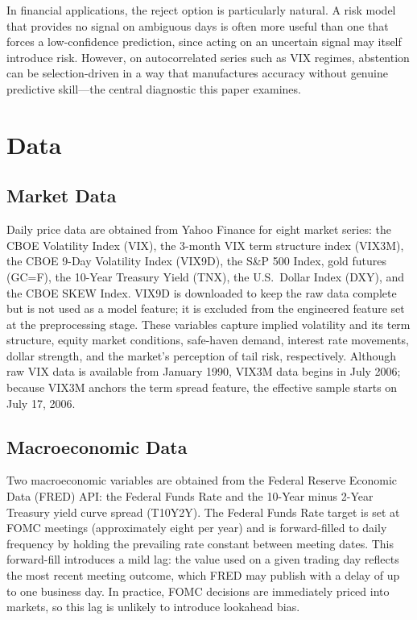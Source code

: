 \documentclass[12pt]{article}
\begin{document}
In financial applications, the reject option is particularly natural. A risk model that provides no signal on ambiguous days is often more useful than one that forces a low-confidence prediction, since acting on an uncertain signal may itself introduce risk. However, on autocorrelated series such as VIX regimes, abstention can be selection-driven in a way that manufactures accuracy without genuine predictive skill---the central diagnostic this paper examines.

\section{Data}
\label{sec:data}

\subsection{Market Data}

Daily price data are obtained from Yahoo Finance for eight market series: the CBOE Volatility Index (VIX), the 3-month VIX term structure index (VIX3M), the CBOE 9-Day Volatility Index (VIX9D), the S\&P 500 Index, gold futures (GC=F), the 10-Year Treasury Yield (TNX), the U.S.\ Dollar Index (DXY), and the CBOE SKEW Index. VIX9D is downloaded to keep the raw data complete but is not used as a model feature; it is excluded from the engineered feature set at the preprocessing stage. These variables capture implied volatility and its term structure, equity market conditions, safe-haven demand, interest rate movements, dollar strength, and the market's perception of tail risk, respectively. Although raw VIX data is available from January 1990, VIX3M data begins in July 2006; because VIX3M anchors the term spread feature, the effective sample starts on July 17, 2006.

\subsection{Macroeconomic Data}

Two macroeconomic variables are obtained from the Federal Reserve Economic Data (FRED) API: the Federal Funds Rate and the 10-Year minus 2-Year Treasury yield curve spread (T10Y2Y). The Federal Funds Rate target is set at FOMC meetings (approximately eight per year) and is forward-filled to daily frequency by holding the prevailing rate constant between meeting dates. This forward-fill introduces a mild lag: the value used on a given trading day reflects the most recent meeting outcome, which FRED may publish with a delay of up to one business day. In practice, FOMC decisions are immediately priced into markets, so this lag is unlikely to introduce lookahead bias.
\end{document}

